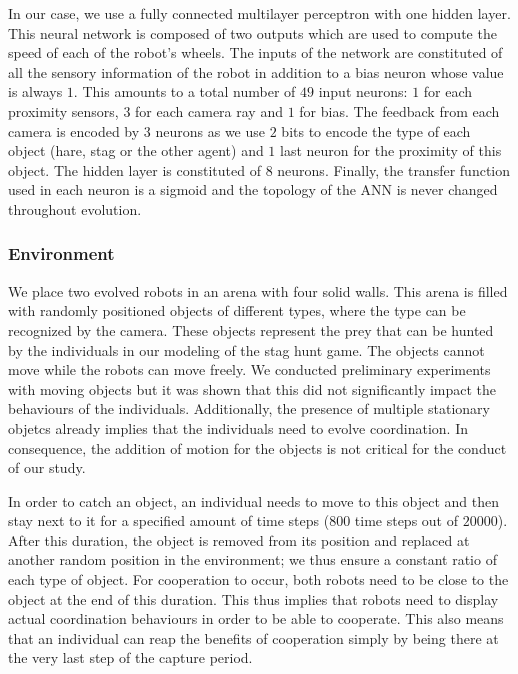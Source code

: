         In our case, we use a fully connected multilayer perceptron with one hidden layer. This neural network is composed of two outputs which are used to compute the speed of each of the robot's wheels. The inputs of the network are constituted of all the sensory information of the robot in addition to a bias neuron whose value is always $1$. This amounts to a total number of $49$ input neurons: $1$ for each proximity sensors, $3$ for each camera ray and $1$ for bias. The feedback from each camera is encoded by $3$ neurons as we use $2$ bits to encode the type of each object (hare, stag or the other agent) and $1$ last neuron for the proximity of this object. The hidden layer is constituted of $8$ neurons. Finally, the transfer function used in each neuron is a sigmoid and the topology of the ANN is never changed throughout evolution.

    \subsubsection{Environment} 

        We place two evolved robots in an arena with four solid walls. This arena is filled with randomly positioned objects of different types, where the type can be recognized by the camera. These objects represent the prey that can be hunted by the individuals in our modeling of the stag hunt game. The objects cannot move while the robots can move freely. We conducted preliminary experiments with moving objects but it was shown that this did not significantly impact the behaviours of the individuals. Additionally, the presence of multiple stationary objetcs already implies that the individuals need to evolve coordination. In consequence, the addition of motion for the objects is not critical for the conduct of our study.

        In order to catch an object, an individual needs to move to this object and then stay next to it for a specified amount of time steps ($800$ time steps out of $20000$). After this duration, the object is removed from its position and replaced at another random position in the environment; we thus ensure a constant ratio of each type of object. For cooperation to occur, both robots need to be close to the object at the end of this duration. This thus implies that robots need to display actual coordination behaviours in order to be able to cooperate. This also means that an individual can reap the benefits of cooperation simply by being there at the very last step of the capture period.

